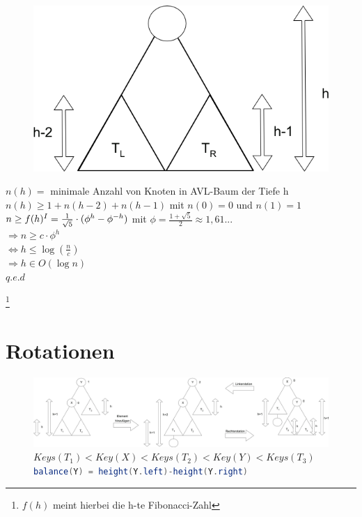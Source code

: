 \begin{minipage}[t]{0.4\textwidth}
\begin{figure}[H]
\includegraphics[width=\textwidth,left]{11/Grafik/img2.png}\\
\end{figure}%

\end{minipage}
\hspace{5mm}
\begin{minipage}[t]{0.55\textwidth}
$n(h) =$ minimale Anzahl von Knoten in AVL-Baum der Tiefe h\\

$n(h) \geq 1+n(h-2) + n(h-1)$ mit  $n(0)=0$ und $n(1)=1$\\

$n \geq f(h)^{\RM{1}} = \frac{1}{\sqrt{5}} \cdot (\phi^h-\phi^{-h})$ mit $\phi = \frac{1+\sqrt{5}}{2} \approx 1,61...$\\
$\Rightarrow n \geq c \cdot \phi^h$\\
$\Leftrightarrow h \leq \log{(\frac{n}{c})}$\\

$\Rightarrow h \in O(\log{n})$\\

$q.e.d$
\end{minipage}


\footnote[1]{$f(h)$ meint hierbei die h-te Fibonacci-Zahl} 

\pagebreak



\section{Rotationen}

\begin{figure}[H]
\includegraphics[width=\textwidth,left]{11/Grafik/img3_Rotation.png}\\

$Keys(T_1) < Key(X) < Keys(T_2) < Key(Y) < Keys(T_3)$ \\
\lstinline[language=Java]{balance(Y) = height(Y.left)-height(Y.right)}
\end{figure}


